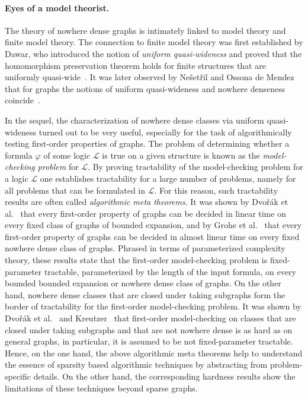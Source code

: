 \paragraph*{Eyes of a model theorist.}
The theory of nowhere dense graphs is intimately linked to model
theory and finite model theory. The connection to finite model
theory was first established by Dawar, who introduced the notion
of \emph{uniform quasi-wideness} and proved that the homomorphism
preservation theorem holds for finite structures that are uniformly
quasi-wide~\cite{dawar2010homomorphism}. It was later
observed by Ne\v{s}et\v{r}il and Ossona de Mendez that for graphs
the notions of uniform quasi-wideness and nowhere denseness
coincide~\cite{nevsetvril2010first}. 

In the sequel, the characterization of nowhere dense classes via
uniform quasi-wideness turned out to be very useful, especially 
for the task of algorithmically testing first-order properties of
graphs. The problem of determining whether a formula $\varphi$
of some logic $\mathcal{L}$ is true on a given structure is known 
as the \emph{model-checking problem} for $\mathcal{L}$. By proving
tractability of the model-checking problem for a logic $\mathcal{L}$
one establishes tractability for a large number of problems, namely
for all problems that can be formulated in $\mathcal{L}$. For this
reason,  such  tractability results are often called 
\emph{algorithmic meta 
theorems}. It was shown by Dvo\v{r}\'ak et al.~\cite{DvorakKT13}
that every first-order property of graphs can be decided in linear time
on every fixed class of graphs of bounded expansion, and by Grohe et 
al.~\cite{grohe2017deciding} that every first-order property of 
graphs can be decided in almost linear time on every fixed nowhere
dense class of graphs. Phrased in terms of parameterized
complexity theory, these results state that the first-order 
model-checking problem is fixed-parameter tractable, parameterized
by the length of the input formula, on every bounded bounded
expansion or nowhere dense class of graphs. On the other hand, 
nowhere dense classes that are closed under taking subgraphs 
form the border of tractability for the first-order 
model-checking problem. 
It was shown by Dvo\v{r}\'ak et al.~\cite{DvorakKT13} and
Kreutzer~\cite{kre11} that first-order model-checking on classes that
are closed under taking subgraphs and that are not nowhere
dense is as hard as on general graphs, in particular, it is 
assumed to be not fixed-parameter tractable. 
Hence, on the one hand, the above algorithmic meta theorems 
help to understand the essence of sparsity
based algorithmic techniques by abstracting from problem-specific
details. On the other hand, the corresponding hardness results show 
the limitations of these techniques beyond sparse graphs. 

